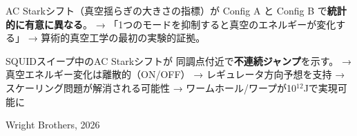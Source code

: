 \documentclass[12pt,a4paper]{article}
\begin{document}
\begin{theorybox}
AC Starkシフト（真空揺らぎの大きさの指標）が
Config A と Config B で\textbf{統計的に有意に異なる}。
→ 「1つのモードを抑制すると真空のエネルギーが変化する」
→ 算術的真空工学の最初の実験的証拠。
\end{theorybox}

\begin{theorybox}
SQUIDスイープ中のAC Starkシフトが
同調点付近で\textbf{不連続ジャンプ}を示す。
→ 真空エネルギー変化は離散的（ON/OFF）
→ レギュレータ方向予想を支持
→ スケーリング問題が解消される可能性
→ ワームホール/ワープが10$^{12}$Jで実現可能に
\end{theorybox}

\vfill
\begin{center}
{\small Wright Brothers, 2026}
\end{center}
\end{document}
